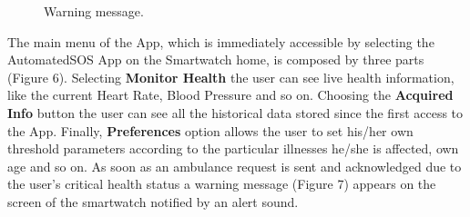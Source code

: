 \begin{enumerate}
\begin{figure}
\begin{center}
\begin{minipage}[c]{.40\textwidth}
          	\caption{Warning message.}
        \end{minipage}
      \end{center}
\end{figure}
The main menu of the App, which is immediately accessible by selecting the AutomatedSOS App on the Smartwatch home, is composed by three parts (Figure 6). Selecting \textbf{Monitor Health} the user can see live health information, like the current Heart Rate, Blood Pressure and so on. Choosing the \textbf{Acquired Info} button the user can see all the historical data stored since the first access to the App. Finally, \textbf{Preferences} option allows the user to set his/her own threshold parameters according to the particular illnesses he/she is affected, own age and so on. As soon as an ambulance request is sent and acknowledged due to the user's critical health status a warning message (Figure 7) appears on the screen of the smartwatch notified by an alert sound.
\clearpage


\end{enumerate}
